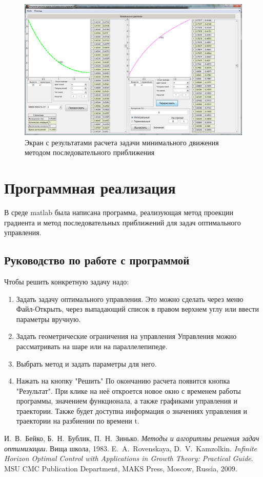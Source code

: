 \documentclass[oneside,final,12pt]{extreport}
\begin{document}
\begin{figure}[!h]
\centering
\includegraphics[scale=0.45]{minimalMovement_mpp_res.png}
\caption{Экран с результатами расчета задачи минимального движения методом последовательного приближения}
\label{minimalMppResPic}
\end{figure}
 
\chapter{Программная реализация}
 
В среде matlab была написана программа, реализующая метод проекции градиента и метод
последовательных приближений для задач оптимального управления.

\section{Руководство по работе с программой}

Чтобы решить конкретную задачу надо:

\begin{enumerate}
\item Задать задачу оптимального управления. Это можно сделать через меню Файл-Открыть, через выпадающий список в правом верхнем углу или ввести параметры вручную.
\item Задать геометрические ограничения на управления
Управления можно рассматривать на шаре или на параллелепипеде.
\item Выбрать метод и задать параметры для него.
\item Нажать на кнопку "Решить"
По окончанию расчета появится кнопка "Результат". При клике на неё откроется новое окно с временем работы программы, значением функционала, а также графиками управления и траектории. Также будет доступна информация о значениях управления и траектории на разбиении по времени t.

\end{enumerate}
 
\begin{thebibliography}{0}
 И.~В.~Бейко, Б.~Н.~Бублик, П.~Н.~Зинько.
\emph{Методы и алгоритмы решения задач оптимизации}.
Вища школа, 1983.
 E.~A.~Rovenskaya, D.~V.~Kamzolkin.
\emph{Infinite Horizon Optimal Control with Applications in Growth Theory: Practical Guide}.
MSU CMC Publication Department, MAKS Press, Moscow, Russia, 2009.
\end{thebibliography}
 
\end{document}
